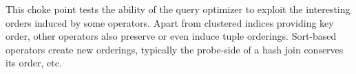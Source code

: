 
This choke point tests the ability of the query optimizer to exploit the
interesting orders induced by some operators. Apart from clustered indices
providing key order, other operators also preserve or even induce tuple
orderings. Sort-based operators create new orderings, typically the probe-side
of a hash join conserves its order, etc.


